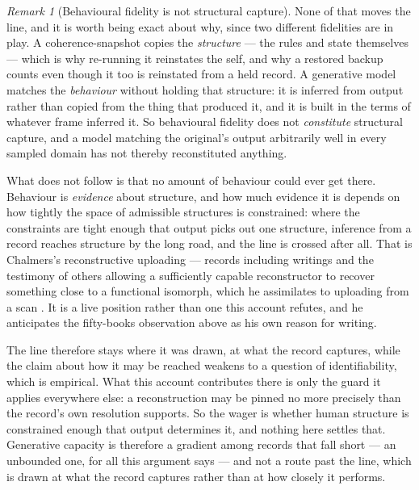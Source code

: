 \documentclass[11pt,a4paper]{article}
\theoremstyle{remark}\newtheorem{remark}[definition]{Remark}
\begin{document}
\begin{remark}[Behavioural fidelity is not structural capture]\label{rem:fidelity-not-capture}
None of that moves the line, and it is worth being exact about why, since two different
fidelities are in play. A coherence-snapshot copies the \emph{structure} --- the rules and state
themselves --- which is why re-running it reinstates the self, and why a restored backup counts
even though it too is reinstated from a held record. A generative model matches the
\emph{behaviour} without holding that structure: it is inferred from output rather than copied
from the thing that produced it, and it is built in the terms of whatever frame inferred it. So
behavioural fidelity does not \emph{constitute} structural capture, and a model matching the
original's output arbitrarily well in every sampled domain has not thereby reconstituted anything.

What does not follow is that no amount of behaviour could ever get there. Behaviour is \emph{evidence} about structure, and how much evidence it is
depends on how tightly the space of admissible structures is constrained: where the constraints are
tight enough that output picks out one structure, inference from a record reaches structure by the
long road, and the line is crossed after all. That is Chalmers's reconstructive uploading --- records
including writings and the testimony of others allowing a sufficiently capable reconstructor to
recover something close to a functional isomorph, which he assimilates to uploading from a scan
\citep{chalmers2014}. It is a live position rather than one this account refutes, and he anticipates
the fifty-books observation above as his own reason for writing.

The line therefore stays where it was drawn, at what the record captures, while the claim about how it
may be reached weakens to a question of identifiability, which is empirical. What this account
contributes there is only the guard it applies everywhere else: a reconstruction may be pinned no more
precisely than the record's own resolution supports. So the wager is whether human structure is
constrained enough that output determines it, and nothing here settles that.
Generative capacity is therefore a gradient among records that fall short --- an unbounded one,
for all this argument says --- and not a route past the line, which is drawn at what the record
captures rather than at how closely it performs.
\end{remark}
\end{document}
